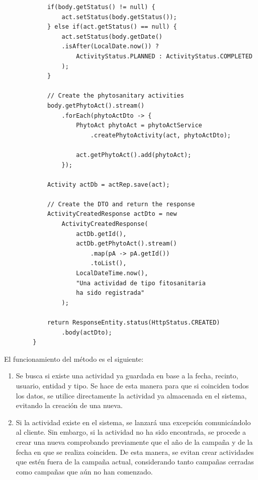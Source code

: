 \begin{itemize}
\begin{verbatim}
            if(body.getStatus() != null) {
                act.setStatus(body.getStatus());
            } else if(act.getStatus() == null) {
                act.setStatus(body.getDate()
                .isAfter(LocalDate.now()) ? 
                    ActivityStatus.PLANNED : ActivityStatus.COMPLETED
                );
            }

            // Create the phytosanitary activities
            body.getPhytoAct().stream()
                .forEach(phytoActDto -> {
                    PhytoAct phytoAct = phytoActService
                        .createPhytoActivity(act, phytoActDto);

                    act.getPhytoAct().add(phytoAct);
                });
            
            Activity actDb = actRep.save(act);
            
            // Create the DTO and return the response
            ActivityCreatedResponse actDto = new 
                ActivityCreatedResponse(
                    actDb.getId(),
                    actDb.getPhytoAct().stream()
                        .map(pA -> pA.getId())
                        .toList(),
                    LocalDateTime.now(),
                    "Una actividad de tipo fitosanitaria 
                    ha sido registrada"
                );

            return ResponseEntity.status(HttpStatus.CREATED)
                .body(actDto);
        }
    \end{verbatim}

    El funcionamiento del método es el siguiente:

    \begin{enumerate}
        \item Se busca si existe una actividad ya guardada en base a la fecha, recinto, usuario, entidad y tipo. Se hace de esta manera para que si coinciden todos los datos,
        se utilice directamente la actividad ya almacenada en el sistema, evitando la creación de una nueva.

        \item Si la actividad existe en el sistema, se lanzará una excepción comunicándolo al cliente. Sin embargo, si la actividad no ha sido encontrada, se procede a crear una
        nueva comprobando previamente que el año de la campaña y de la fecha en que se realiza coinciden. De esta manera, se evitan crear actividades que estén fuera de la campaña
        actual, considerando tanto campañas cerradas como campañas que aún no han comenzado.


\end{enumerate}
\end{itemize}
